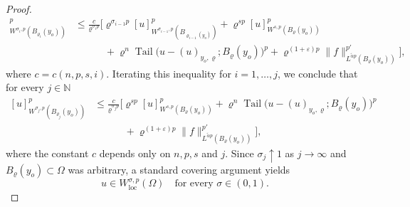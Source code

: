 \documentclass[10pt,letterpaper]{amsart}
\theoremstyle{definition}
\numberwithin{theorem}{section}
\numberwithin{equation}{section}
\newcommand{\1}{\ensuremath{\mathds{1}}}
\renewcommand{\epsilon}{\varepsilon}
\renewcommand{\rho}{\varrho}
\renewcommand{\epsilon}{\varepsilon}
\renewcommand{\rho}{\varrho}
\DeclareMathOperator{\Tail}{Tail}
\numberwithin{equation}{section}
\begin{document}
\begin{proof}
\begin{align*}
      [u]_{W^{\sigma_i,p}(B_{\rho_i}(y_o))}^p
    &\le
    \frac{c}{\rho^{\sigma_i p}} 
    \Big[
        \rho^{\sigma_{i-1}p}[u]_{W^{\sigma_{i-1},p}(B_{\rho_{i-1}(y_o)})}^p +
        \rho^{sp} [u]_{W^{s,p}(B_{\rho}(y_o))}^p \\
        &\phantom{\le\, \frac{c}{\rho^{\sigma_i p}} 
    \Big[}
        + \rho^n\Tail\big(u-(u)_{y_o,\rho};B_\rho(y_o)\big)^p
        + \rho^{(1+\epsilon)p}\|f\|_{L^{\tilde \alpha p}(B_{\rho}(y_o))}^{p'}
    \Big],
\end{align*}
where $c=c(n,p,s,i)$. 
Iterating this inequality for \(i=1,\dots,j\), we conclude that for every
\(j\in\mathbb{N}\)
\begin{align}\label{est-2}
    [u]_{W^{\sigma_j,p}(B_{\rho_j}(y_o))}^p &\leq 
    \frac{c}{\rho^{\sigma_jp}} 
    \Big[ \rho^{sp}[u]_{W^{s,p}(B_{\rho}(y_o))}^p + 
    \rho^n\Tail\big(u-(u)_{y_o,\rho};B_\rho(y_o)\big)^p \nonumber\\
    &\phantom{\le\,\frac{c}{\rho^{\sigma_jp}} 
    \Big[ } + \rho^{(1+\epsilon)p}\|f\|_{L^{\tilde\alpha p}(B_\rho(y_o))}^{p'}\Big],
\end{align}
where the constant \(c\) depends only on \(n,p,s\) and \(j\). 
Since \(\sigma_j \uparrow 1\) as \(j\to\infty\) and $B_\rho(y_o)\subset\Omega$ was arbitrary, a standard covering argument yields
\[
    u \in W^{\sigma,p}_{\mathrm{loc}}(\Omega)
    \quad \text{for every } \sigma\in(0,1).
\]


\end{proof}
\end{document}
